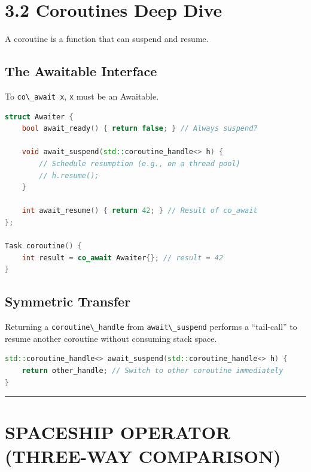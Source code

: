 \hypertarget{coroutines-deep-dive}{%
\section{3.2 Coroutines Deep Dive}\label{coroutines-deep-dive}}

A coroutine is a function that can suspend and resume.

\hypertarget{the-awaitable-interface}{%
\subsection{The Awaitable Interface}\label{the-awaitable-interface}}

To \passthrough{\lstinline!co\_await x!}, \passthrough{\lstinline!x!}
must be an Awaitable.

\begin{lstlisting}[language={C++}]
struct Awaiter {
    bool await_ready() { return false; } // Always suspend?
    
    void await_suspend(std::coroutine_handle<> h) {
        // Schedule resumption (e.g., on a thread pool)
        // h.resume(); 
    }
    
    int await_resume() { return 42; } // Result of co_await
};

Task coroutine() {
    int result = co_await Awaiter{}; // result = 42
}
\end{lstlisting}

\hypertarget{symmetric-transfer}{%
\subsection{Symmetric Transfer}\label{symmetric-transfer}}

Returning a \passthrough{\lstinline!coroutine\_handle!} from
\passthrough{\lstinline!await\_suspend!} performs a ``tail-call'' to
resume another coroutine without consuming stack space.

\begin{lstlisting}[language={C++}]
std::coroutine_handle<> await_suspend(std::coroutine_handle<> h) {
    return other_handle; // Switch to other coroutine immediately
}
\end{lstlisting}

\begin{center}\rule{0.5\linewidth}{0.5pt}\end{center}

\hypertarget{spaceship-operator-three-way-comparison}{%
\section{SPACESHIP OPERATOR (THREE-WAY
COMPARISON)}\label{spaceship-operator-three-way-comparison}}


